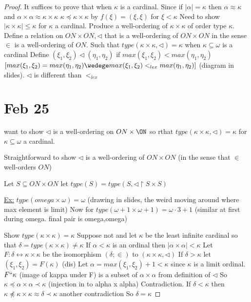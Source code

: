 \begin{proof}
    It suffices to prove that when $\kappa$ is a cardinal.
    Since if $|\alpha| = \kappa$ then $\alpha \approx \kappa$
    and $\alpha \times \alpha \approx \kappa \times \kappa$
    $\kappa \preceq \kappa \times \kappa$ by $f(\xi) = (\xi, \xi)$ for $\xi < \kappa$
    Need to show $|\kappa \times \kappa | \leq \kappa$ for $\kappa$ a cardinal.
    Produce a well-ordering of $\kappa \times \kappa$ of order type $\kappa$.
    Define a relation on $ON \times ON, \triangleleft$ that is a well-ordering of $ON \times ON$
    in the sense $\in$ is a well-ordering of $ON$.
    Such that $type(\kappa \times \kappa, \triangleleft) = \kappa$ when $\kappa \subseteq \omega$ is a cardinal
    Define $(\xi_1,\xi_2) \triangleleft (\eta_1,\eta_2)$
    if $max(\xi_1,\xi_2) < max(\eta_1,\eta_2)$ \vee
    $[max(\xi_1,\xi_2) = max(\eta_1,\eta_2) \wedege max(\xi_1,\xi_2) <_{lex} max(\eta_1,\eta_2)]$
    (diagram in slides).
    $\triangleleft$ is different than $<_{lex}$

    \section{Feb 25}
    want to show $\triangleleft$ is a well-ordering on $ON \times \ON$ so rthat $type(\kappa \times \kappa, \triangleleft) = \kappa$ for $\kappa \subseteq \omega$ a cardinal.

    Straightforward to show $\triangleleft$ is a well-ordering of $ON \times ON$ (in the sense that $\in$ well-orders $ON$)

    Let $S \subseteq ON \times ON$ let $type(S) = type(S, \triangleleft \upharpoonright S \times S)$

    \underline{Ex:} $type(omega \times \omega) = \omega$ (drawing in slides, the weird moving around where max element is limit)
    Now for $type(\omega + 1 \times \omega + 1) = \omega \cdot 3 + 1$ (similar at first during omega. final pair is omega,omega)

    Show $type(\kappa \times \kappa) = \kappa$
    Suppose not and let $\kappa$ be the least infinite cardinal so that $\delta=type(\kappa \times \kappa) \neq \kappa$
    If $\alpha < \kappa$ is an ordinal then $|\alpha \times \alpha| < \kappa$
    Let $F : \delta \leftrightarrow \kappa \times \kappa$ be the isomorphism $(\delta ; \in)$ to $(\kappa \times \kappa, \triangleleft)$
    If $\delta > \kappa$ let $(\xi_1, \xi_2) = F(\kappa)$ (dis)
    Let $\alpha = max(\xi_1,\xi_2) + 1 < \kappa$ since $\kappa$ is a limit ordinal.
    $F``\kappa$ (image of kappa under F) is a subset of $\alpha \times \alpha$ from definition of $\triangleleft$
    So $\kappa \preceq \alpha \times \alpha \prec \kappa$ (injection in to alpha x alpha)
    Contradiction.
    If $\delta < \kappa$ then $\kappa \npreceq \kappa \times \kappa \approx \delta \prec \kappa$ another contradiction
    So $\delta = \kappa$
\end{proof}


